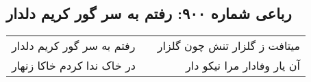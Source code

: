 \begin{center}
\section*{رباعی شماره ۹۰۰: رفتم به سر گور کریم دلدار}
\label{sec:0900}
\begin{longtable}{l p{0.5cm} r}
رفتم به سر گور کریم دلدار
&&
میتافت ز گلزار تنش چون گلزار
\\
در خاک ندا کردم خاکا زنهار
&&
آن یار وفادار مرا نیکو دار
\\
\end{longtable}
\end{center}
